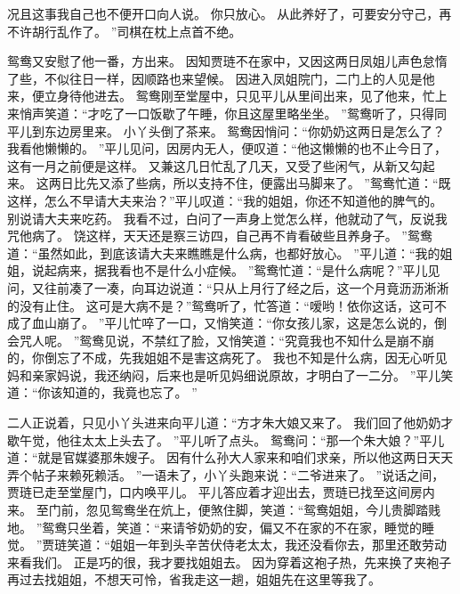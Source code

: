 况且这事我自己也不便开口向人说。
你只放心。
从此养好了，可要安分守己，再不许胡行乱作了。
”司棋在枕上点首不绝。
\par
鸳鸯又安慰了他一番，方出来。
因知贾琏不在家中，又因这两日凤姐儿声色怠惰了些，不似往日一样，因顺路也来望候。
因进入凤姐院门，二门上的人见是他来，便立身待他进去。
鸳鸯刚至堂屋中，只见平儿从里间出来，见了他来，忙上来悄声笑道：“才吃了一口饭歇了午睡，你且这屋里略坐坐。
”鸳鸯听了，只得同平儿到东边房里来。
小丫头倒了茶来。
鸳鸯因悄问：“你奶奶这两日是怎么了？我看他懒懒的。
”平儿见问，因房内无人，便叹道：“他这懒懒的也不止今日了，这有一月之前便是这样。
又兼这几日忙乱了几天，又受了些闲气，从新又勾起来。
这两日比先又添了些病，所以支持不住，便露出马脚来了。
”鸳鸯忙道：“既这样，怎么不早请大夫来治？”平儿叹道：“我的姐姐，你还不知道他的脾气的。
别说请大夫来吃药。
我看不过，白问了一声身上觉怎么样，他就动了气，反说我咒他病了。
饶这样，天天还是察三访四，自己再不肯看破些且养身子。
”鸳鸯道：“虽然如此，到底该请大夫来瞧瞧是什么病，也都好放心。
”平儿道：“我的姐姐，说起病来，据我看也不是什么小症候。
”鸳鸯忙道：“是什么病呢？”平儿见问，又往前凑了一凑，向耳边说道：“只从上月行了经之后，这一个月竟沥沥淅淅的没有止住。
这可是大病不是？”鸳鸯听了，忙答道：“嗳哟！依你这话，这可不成了血山崩了。
”平儿忙啐了一口，又悄笑道：“你女孩儿家，这是怎么说的，倒会咒人呢。
”鸳鸯见说，不禁红了脸，又悄笑道：“究竟我也不知什么是崩不崩的，你倒忘了不成，先我姐姐不是害这病死了。
我也不知是什么病，因无心听见妈和亲家妈说，我还纳闷，后来也是听见妈细说原故，才明白了一二分。
”平儿笑道：“你该知道的，我竟也忘了。
”\par
二人正说着，只见小丫头进来向平儿道：“方才朱大娘又来了。
我们回了他奶奶才歇午觉，他往太太上头去了。
”平儿听了点头。
鸳鸯问：“那一个朱大娘？”平儿道：“就是官媒婆那朱嫂子。
因有什么孙大人家来和咱们求亲，所以他这两日天天弄个帖子来赖死赖活。
”一语未了，小丫头跑来说：“二爷进来了。
”说话之间，贾琏已走至堂屋门，口内唤平儿。
平儿答应着才迎出去，贾琏已找至这间房内来。
至门前，忽见鸳鸯坐在炕上，便煞住脚，笑道：“鸳鸯姐姐，今儿贵脚踏贱地。
”鸳鸯只坐着，笑道：“来请爷奶奶的安，偏又不在家的不在家，睡觉的睡觉。
”贾琏笑道：“姐姐一年到头辛苦伏侍老太太，我还没看你去，那里还敢劳动来看我们。
正是巧的很，我才要找姐姐去。
因为穿着这袍子热，先来换了夹袍子再过去找姐姐，不想天可怜，省我走这一趟，姐姐先在这里等我了。
